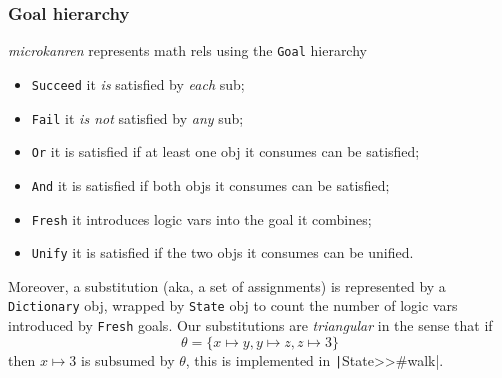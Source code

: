 \documentclass[9pt]{beamer}
\begin{document}

\begin{frame}[fragile]
\frametitle{Goal hierarchy}
\textit{microkanren} represents math rels using the \verb|Goal| hierarchy
\begin{itemize}
\item \verb|Succeed| it \textit{is} satisfied by \textit{each} sub;
\item \verb|Fail| it \textit{is not} satisfied by \textit{any} sub;
\item \verb|Or| it is satisfied if at least one obj it consumes can be satisfied;
\item \verb|And| it is satisfied if both objs it consumes can be satisfied;
\item \verb|Fresh| it introduces logic vars into the goal it combines;
\item \verb|Unify| it is satisfied if the two objs it consumes can be unified.
\end{itemize}
\vfill
Moreover, a substitution (aka, a set of assignments) is represented by a
\verb|Dictionary| obj, wrapped by \verb|State| obj to count the number of logic
vars introduced by \verb|Fresh| goals.
\vfill
Our substitutions are \textit{triangular} in the sense that if
\begin{displaymath}
\theta =  \lbrace x \mapsto y, y \mapsto z, z \mapsto 3 \rbrace
\end{displaymath}
then $x \mapsto 3$ is subsumed by $\theta$,
this is implemented in \texttt|State>>#walk|.
\end{frame}
\end{document}
